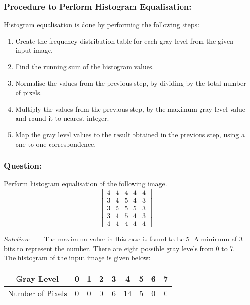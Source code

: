 \subsubsection{Procedure to Perform Histogram Equalisation:}

Histogram equalisation is done by performing the following steps:
\begin{enumerate}
    \item Create the frequency distribution table for each gray level from the given input image. 
    \item Find the running sum of the histogram values.
    \item Normalise the values from the previous step, by dividing by the total number of pixels.
    \item Multiply the values from the previous step, by the maximum gray-level value and round it to nearest integer.
    \item Map the gray level values to the result obtained in the previous step, using a one-to-one correspondence.
\end{enumerate}

\subsubsection{Question:}
Perform histogram equalisation of the following image.
\begin{equation*}
    \begin{bmatrix}
        4 & 4 & 4 & 4 & 4\\
        3 & 4 & 5 & 4 & 3\\
        3 & 5 & 5 & 5 & 3\\
        3 & 4 & 5 & 4 & 3\\
        4 & 4 & 4 & 4 & 4
    \end{bmatrix}
\end{equation*}

\textit{Solution:}\ \ \ \ The maximum value in this case is found to be 5.
A minimum of 3 bits to represent the number.
There are eight possible gray levels from 0 to 7.
The histogram of the input image is given below:

\begin{table}[h!]
    \centering
    \begin{tabular}{|c|c|c|c|c|c|c|c|c|}
        \hline
        Gray Level & 0 & 1 & 2 & 3 & 4 & 5 & 6 & 7\\
        \hline
        Number of Pixels & 0 & 0 & 0 & 6 & 14 & 5 & 0 & 0\\
        \hline
    \end{tabular}
\end{table}

